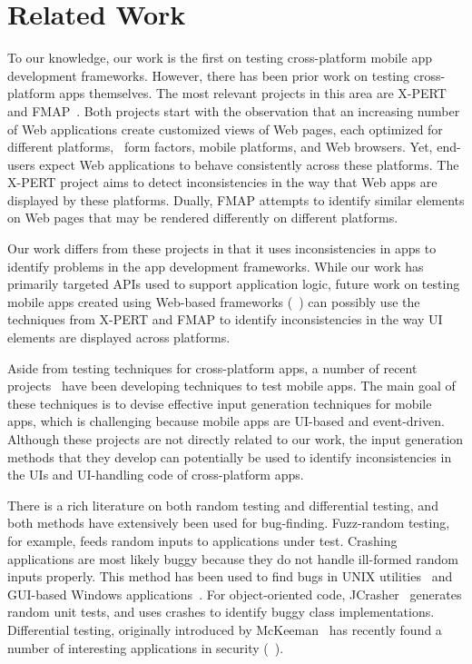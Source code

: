 \section{Related Work}
\label{section:related}

%
To our knowledge, our work is the first on testing cross-platform mobile app
development frameworks. However, there has been prior work on testing
cross-platform apps themselves. The most relevant projects in this area are
X-PERT~\cite{xpert:icse13} and FMAP~\cite{fmap:issta14}. Both projects start
with the observation that an increasing number of Web applications create
customized views of Web pages, each optimized for different platforms, \eg~form
factors, mobile platforms, and Web browsers. Yet, end-users expect Web
applications to behave consistently across these platforms.  The X-PERT project
aims to detect inconsistencies in the way that Web apps are displayed by these
platforms. Dually, FMAP attempts to identify similar elements on Web pages that
may be rendered differently on different platforms.

Our work differs from these projects in that it uses inconsistencies in apps to
identify problems in the app development frameworks. While our work has
primarily targeted APIs used to support application logic, future work on
testing mobile apps created using Web-based frameworks
(\eg~\cite{phonegap,sencha,worklight}) can possibly use the techniques from
X-PERT and FMAP to identify inconsistencies in the way UI elements are
displayed across platforms.

Aside from testing techniques for cross-platform apps, a number of recent
projects~\cite{dynodroid:fse13,concolicandroid:fse12,eventbreak:oopsla14,azim:oopsla13,memon:ase07,guitar:memon}
have been developing techniques to test mobile apps. The main goal of these
techniques is to devise effective input generation techniques for mobile apps,
which is challenging because mobile apps are UI-based and event-driven.
Although these projects are not directly related to our work, the input
generation methods that they develop can potentially be used to identify
inconsistencies in the UIs and UI-handling code of cross-platform apps.

%
There is a rich literature on both random testing and differential testing, and
both methods have extensively been used for bug-finding. Fuzz-random testing,
for example, feeds random inputs to applications under test. Crashing
applications are most likely buggy because they do not handle ill-formed random
inputs properly. This method has been used to find bugs in UNIX
utilities~\cite{fuzz:unix} and GUI-based Windows applications~\cite{fuzz:nt}.
For object-oriented code, JCrasher~\cite{jcrasher} generates random unit tests,
and uses crashes to identify buggy class implementations. Differential testing,
originally introduced by McKeeman~\cite{mckeeman:difftest:1998}  has recently
found a number of interesting applications in security
(\eg~\cite{brumley:sec07,franken:oak14,oracle:pldi11}).

